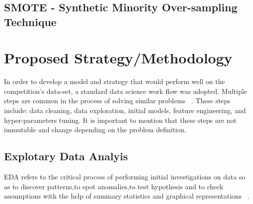 \documentclass[journal,twoside,web]{ieeecolor}
\begin{document}
\subsection{SMOTE - Synthetic Minority Over-sampling Technique}






\section{Proposed Strategy/Methodology}
In order to develop a model and strategy that would perform well on the competition's data-set, a standard data science work flow was adopted. Multiple steps are common in the process of solving similar problems ~\cite{tandel_2017}. These steps include: data cleaning, data exploration, initial models, feature engineering, and hyper-parameters tuning. It is important to mention that these steps are not immutable and change depending on the problem definition.








\subsection{Explotary Data Analyis}
EDA refers to the critical process of performing initial investigations on data so as to discover patterns,to spot anomalies,to test hypothesis and to check assumptions with the help of summary statistics and graphical representations ~\cite{patil_patil_2018}.



\end{document}
